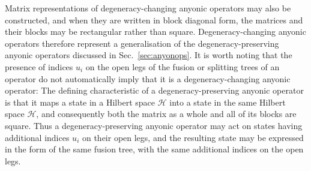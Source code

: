 \documentclass[aps,prb,reprint,superscriptaddress,amsfonts,amsmath,amssymb,showpacs,floatfix]{revtex4-1}
\newcommand{\mc}[1]{\mathcal{#1}}
\newcommand{\sref}[1]{Sec.~\ref{#1}}
\begin{document}



Matrix representations of degeneracy-changing anyonic operators may also %
be constructed, and when they %
are written in block diagonal form, the matrices and their blocks may be rectangular rather than square. Degeneracy-changing anyonic operators therefore 
represent a generalisation of the degeneracy-preserving anyonic operators discussed in \sref{sec:anyonops}. It is worth noting that the presence of indices $u_i$ on the open legs of the fusion or splitting trees of an operator do not automatically imply that it is a degeneracy-changing anyonic operator: The defining characteristic of a degeneracy-preserving anyonic operator is that it maps a state in a Hilbert space $\mc{H}$ into a state in the same Hilbert space $\mc{H}$, and consequently both the matrix as a whole and all of its blocks are square. Thus a degeneracy-preserving anyonic operator may act on states having additional indices $u_i$ on their open legs, and the resulting state may be expressed in the form of the same fusion tree, with the same additional indices on the open legs.

\end{document}
